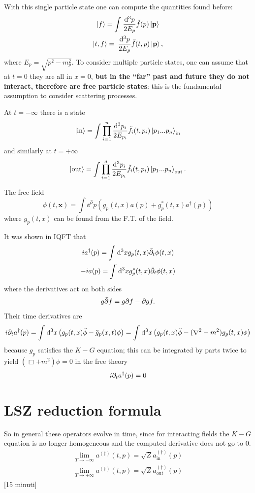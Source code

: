 With this single particle state one can compute the quantities found before:
\begin{gather*}
    \ket{f} = \int_{}^{} \frac{\dd^3p}{2E_p}\tilde f(p)\ket{\mathbf{p}}\\
    \ket{t,f} = \frac{}{}\frac{\dd^3p}{2E_p}\tilde f(t,p)\ket{\mathbf{p}},
\end{gather*}
where $E_p = \sqrt{p^2-m_p^2}$.
To consider multiple particle states, one can assume that at $t=0$ they
are all in $x=0$, \textbf{but in the ``far'' past and future they do not interact,
therefore are free particle states}: this is the fundamental assumption
to consider scattering processes.

At $t=-\infty$ there is a state
\[
    \ket{\text{in}} = \int\prod_{i=1}^{n}\frac{\dd^3p_i}{2E_{p_i}}
    \tilde f_i(t,p_i)\ket{p_1...p_n}_\text{in}
\]
and similarly at $t=+\infty$
\[
    \ket{\text{out}} = \int\prod_{i=1}^{n}\frac{\dd^3p_i}{2E_{p_i}}
    \tilde f_i(t,p_i)\ket{p_1...p_n}_\text{out}.
\]

The free field
\[
    \phi(t,\mathbf{x}) = \int\dd^3p\left(g_p(t,x)a(p)+g^*_p(t,x)a^\dagger(p)
    \right) 
\]
where $g_p(t,x)$ can be found from the F.T. of the field.

It was shown in IQFT that
\begin{gather*}
    ia^\dagger (p)=\int_{}^{} \dd^3x g_p(t,x)\bar{\partial}_t\phi(t,x)\\
    -ia (p)=\int_{}^{} \dd^3x g^*_p(t,x)\bar{\partial}_t\phi(t,x)
\end{gather*}
where the derivatives act on both sides
\[
    g\bar{\partial} f = g\partial f - \partial g f.
\]
Their time derivatives are
\begin{gather*}
    i\pd_t a^\dagger (p) = \int_{}^{} \dd^3x\left(g_p(t,x)\ddot \phi - \ddot
    g_p(x,t)\phi\right) = \int_{}^{} \dd^3x \left(g_p(t,x)\ddot \phi - (
    \laplacian -m^2)g_p(t,x)\phi\right)
\end{gather*}
because $g_p$ satisfies the $K-G$ equation; this can be integrated by parts twice
to yield $(\Box +m^2) \phi=0$ in the free theory   
\[
    i\partial_ta^\dagger(p) = 0
\]
\section{LSZ reduction formula}
So in general these operators evolve in time, since for interacting fields the
$K-G$ equation is no longer homogeneous and the computed derivative does not
go to 0.
\begin{gather*}
    \lim\limits_{T\to-\infty} a^{(\dagger)}(t,p) = \sqrt{Z}a_\text{in}^{(\dagger)}
    (p)\\
    \lim\limits_{T\to+\infty} a^{(\dagger)}(t,p) =\sqrt{Z}a_\text{out}^{(\dagger)}
    (p)
\end{gather*}
[15 minuti]
